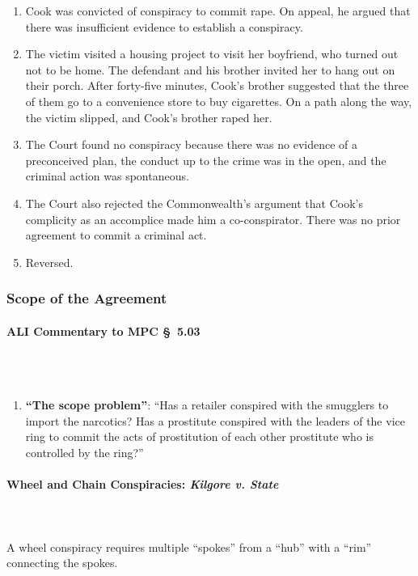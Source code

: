 \begin{enumerate}
    \item Cook was convicted of conspiracy to commit rape. On appeal, he 
    argued that there was insufficient evidence to establish a conspiracy.
    \item The victim visited a housing project to visit her boyfriend, who 
    turned out not to be home. The defendant and his brother invited her to 
    hang out on their porch. After forty-five minutes, Cook's brother 
    suggested that the three of them go to a convenience store to buy 
    cigarettes. On a path along the way, the victim slipped, and Cook's 
    brother raped her.
    \item The Court found no conspiracy because there was no evidence of a 
    preconceived plan, the conduct up to the crime was in the open, and the 
    criminal action was spontaneous.
    \item The Court also rejected the Commonwealth's argument that Cook's 
    complicity as an accomplice made him a co-conspirator. There was no prior 
    agreement to commit a criminal act.
    \item Reversed.
\end{enumerate}

\subsubsection{Scope of the Agreement}

\paragraph{ALI Commentary to MPC \S\ 5.03}
~\\\\
\begin{enumerate}
    \item \textbf{``The scope problem''}: ``Has a retailer conspired with the 
    smugglers to import the narcotics? Has a prostitute conspired with the 
    leaders of the vice ring to commit the acts of prostitution of each other 
    prostitute who is controlled by the ring?''
\end{enumerate}

\paragraph{Wheel and Chain Conspiracies: \emph{Kilgore v. State}}
~\\\\
A wheel conspiracy requires multiple ``spokes'' from a ``hub'' with a ``rim'' 
connecting the spokes.

